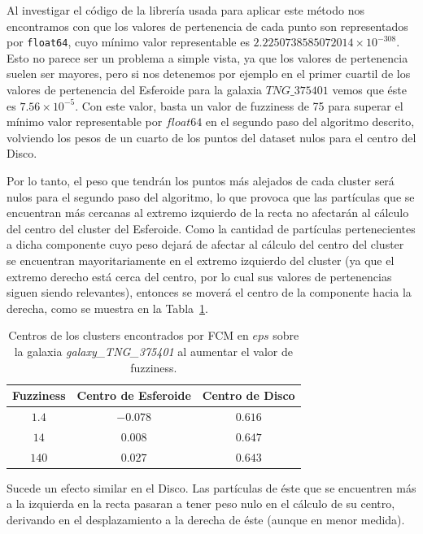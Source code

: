 Al investigar el código de la librería usada para aplicar este método nos encontramos con que los valores de pertenencia de cada punto son representados por \texttt{float64}, cuyo mínimo valor representable es $2.2250738585072014 \times 10^{-308}$. Esto no parece ser un problema a simple vista, ya que los valores de pertenencia suelen ser mayores, pero si nos detenemos por ejemplo en el primer cuartil de los valores de pertenencia del Esferoide para la galaxia $TNG\_375401$ vemos que éste es $7.56 \times 10^{-5}$. Con este valor, basta un valor de fuzziness de 75 para superar el mínimo valor representable por $float64$ en el segundo paso del algoritmo descrito, volviendo los pesos de un cuarto de los puntos del dataset nulos para el centro del Disco.

Por lo tanto, el peso que tendrán los puntos más alejados de cada cluster será nulos para el segundo paso del algoritmo, lo que provoca que las partículas que se encuentran más cercanas al extremo izquierdo de la recta no afectarán al cálculo del centro del cluster del Esferoide. Como la cantidad de partículas pertenecientes a dicha componente cuyo peso dejará de afectar al cálculo del centro del cluster se encuentran mayoritariamente en el extremo izquierdo del cluster (ya que el extremo derecho está cerca del centro, por lo cual sus valores de pertenencias siguen siendo relevantes), entonces se moverá el centro de la componente hacia la derecha, como se muestra en la Tabla~\ref{table:2componentesFC375401}.

\begin{table}[h!]
\centering
\begin{tabular}{|c|c|c|}
\hline
Fuzziness&Centro de Esferoide&Centro de Disco\\
\hline
$1.4$ & $-0.078$ & $0.616$\\
\hline
$14$ & $0.008$ & $0.647$\\
\hline
$140$ & $0.027$ & $0.643$\\
\hline
\end{tabular}
\caption{Centros de los clusters encontrados por \gls{FCM} en $eps$ sobre la galaxia \textit{galaxy\_TNG\_375401} al aumentar el valor de fuzziness.}
\label{table:2componentesFC375401}
\end{table}

Sucede un efecto similar en el Disco. Las partículas de éste que se encuentren más a la izquierda en la recta pasaran a tener peso nulo en el cálculo de su centro, derivando en el desplazamiento a la derecha de éste (aunque en menor medida).

